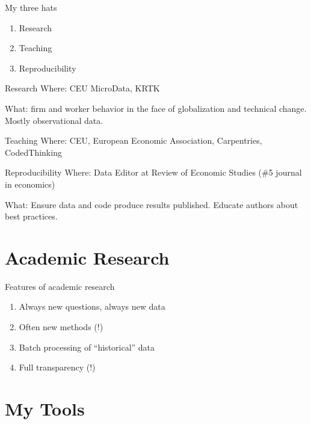 \documentclass[
  ignorenonframetext,
  aspectratio=54,
]{beamer}
\providecommand{\tightlist}{%
  \setlength{\itemsep}{0pt}\setlength{\parskip}{0pt}}
\begin{document}
\begin{frame}{My three hats}
\protect\hypertarget{my-three-hats}{}
\begin{enumerate}
\tightlist
\item
  Research
\item
  Teaching
\item
  Reproducibility
\end{enumerate}
\end{frame}

\begin{frame}{Research}
\protect\hypertarget{research}{}
Where: CEU MicroData, KRTK

What: firm and worker behavior in the face of globalization and
technical change. Mostly observational data.
\end{frame}

\begin{frame}{Teaching}
\protect\hypertarget{teaching}{}
Where: CEU, European Economic Association, Carpentries, CodedThinking
\end{frame}

\begin{frame}{Reproducibility}
\protect\hypertarget{reproducibility}{}
Where: Data Editor at Review of Economic Studies (\#5 journal in
economics)

What: Ensure data and code produce results published. Educate authors
about best practices.
\end{frame}

\hypertarget{academic-research}{%
\section{Academic Research}\label{academic-research}}

\begin{frame}{Features of academic research}
\protect\hypertarget{features-of-academic-research}{}
\begin{enumerate}
\tightlist
\item
  Always new questions, always new data
\item
  Often new methods (!)
\item
  Batch processing of ``historical'' data
\item
  Full transparency (!)
\end{enumerate}
\end{frame}

\hypertarget{my-tools}{%
\section{My Tools}\label{my-tools}}
\end{document}
